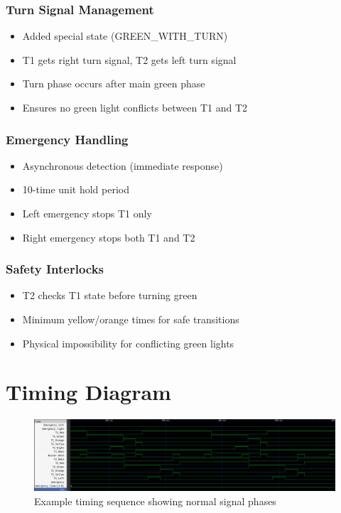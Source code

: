 \documentclass{article}
\begin{document}
\subsubsection{Turn Signal Management}
\begin{itemize}
    \item Added special state (GREEN\_WITH\_TURN)
    \item T1 gets right turn signal, T2 gets left turn signal
    \item Turn phase occurs after main green phase
    \item Ensures no green light conflicts between T1 and T2
\end{itemize}

\subsubsection{Emergency Handling}
\begin{itemize}
    \item Asynchronous detection (immediate response)
    \item 10-time unit hold period
    \item Left emergency stops T1 only
    \item Right emergency stops both T1 and T2
\end{itemize}

\subsubsection{Safety Interlocks}
\begin{itemize}
    \item T2 checks T1 state before turning green
    \item Minimum yellow/orange times for safe transitions
    \item Physical impossibility for conflicting green lights
\end{itemize}

\section{Timing Diagram}
\begin{figure}[H]
\centering
\includegraphics[width=\textwidth]{figs/test.png}
\caption{Example timing sequence showing normal signal phases}
\end{figure}
\end{document}
